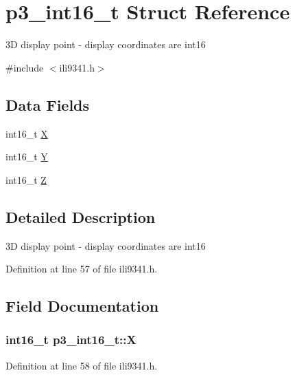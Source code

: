 \hypertarget{structp3__int16__t}{}\section{p3\+\_\+int16\+\_\+t Struct Reference}
\label{structp3__int16__t}


3D display point -\/ display coordinates are int16  




{\ttfamily \#include $<$ili9341.\+h$>$}

\subsection*{Data Fields}
\begin{DoxyCompactItemize}
\item 
int16\+\_\+t \hyperlink{structp3__int16__t_a85f1cacad0323b08b2b6b179abeaee79}{X}
\item 
int16\+\_\+t \hyperlink{structp3__int16__t_a8bbd7ad56a3bb5399524c40527556d89}{Y}
\item 
int16\+\_\+t \hyperlink{structp3__int16__t_a783a79cfeb34e41432b26918fd28144f}{Z}
\end{DoxyCompactItemize}


\subsection{Detailed Description}
3D display point -\/ display coordinates are int16 

Definition at line 57 of file ili9341.\+h.



\subsection{Field Documentation}
\subsubsection[{\texorpdfstring{X}{X}}]{\setlength{\rightskip}{0pt plus 5cm}int16\+\_\+t p3\+\_\+int16\+\_\+t\+::X}\hypertarget{structp3__int16__t_a85f1cacad0323b08b2b6b179abeaee79}{}\label{structp3__int16__t_a85f1cacad0323b08b2b6b179abeaee79}


Definition at line 58 of file ili9341.\+h.

